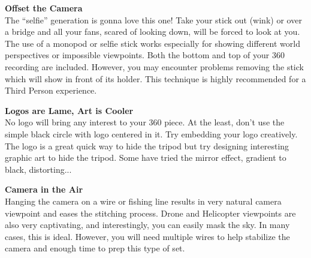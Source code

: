 \begin{fullwidth}

{\bfseries Offset the Camera}
\\
The “selfie” generation is gonna love this one! Take your stick out (wink) or over a bridge and all your fans, scared of looking down, will be forced to look at you. The use of a monopod or selfie stick works especially for showing different world perspectives or impossible viewpoints. Both the bottom and top of your 360 recording are included. However, you may encounter problems removing the stick which will show in front of its holder. This technique is highly recommended for a Third Person experience.


{\bfseries Logos are Lame, Art is Cooler}
\\
No logo will bring any interest to your 360 piece. At the least, don’t use the simple black circle with logo centered in it. Try embedding your logo creatively. The logo is a great quick way to hide the tripod but try designing interesting graphic art to hide the tripod. Some have tried the mirror effect, gradient to black, distorting... 

\clearpage
{\bfseries Camera in the Air}
\\
Hanging the camera on a wire or fishing line results in very natural camera viewpoint and eases the stitching process. Drone and Helicopter viewpoints are also very captivating, and interestingly, you can easily mask the sky. In many cases, this is ideal. However, you will need multiple wires to help stabilize the camera and enough time to prep this type of set.



\end{fullwidth}
